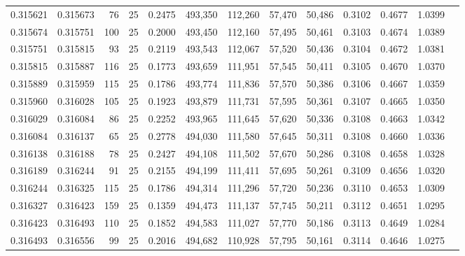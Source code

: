 \begin{tabular}{rrrrrrrrrrrrr}
0.315621 & 0.315673 &    76 &  25 &                                     0.2475 & 493,350 & 112,260 &  57,470 &  50,486 & 0.3102 & 0.4677 & 1.0399 \\
0.315674 & 0.315751 &   100 &  25 &                                     0.2000 & 493,450 & 112,160 &  57,495 &  50,461 & 0.3103 & 0.4674 & 1.0389 \\
0.315751 & 0.315815 &    93 &  25 &                                     0.2119 & 493,543 & 112,067 &  57,520 &  50,436 & 0.3104 & 0.4672 & 1.0381 \\
0.315815 & 0.315887 &   116 &  25 &                                     0.1773 & 493,659 & 111,951 &  57,545 &  50,411 & 0.3105 & 0.4670 & 1.0370 \\
0.315889 & 0.315959 &   115 &  25 &                                     0.1786 & 493,774 & 111,836 &  57,570 &  50,386 & 0.3106 & 0.4667 & 1.0359 \\
0.315960 & 0.316028 &   105 &  25 &                                     0.1923 & 493,879 & 111,731 &  57,595 &  50,361 & 0.3107 & 0.4665 & 1.0350 \\
0.316029 & 0.316084 &    86 &  25 &                                     0.2252 & 493,965 & 111,645 &  57,620 &  50,336 & 0.3108 & 0.4663 & 1.0342 \\
0.316084 & 0.316137 &    65 &  25 &                                     0.2778 & 494,030 & 111,580 &  57,645 &  50,311 & 0.3108 & 0.4660 & 1.0336 \\
0.316138 & 0.316188 &    78 &  25 &                                     0.2427 & 494,108 & 111,502 &  57,670 &  50,286 & 0.3108 & 0.4658 & 1.0328 \\
0.316189 & 0.316244 &    91 &  25 &                                     0.2155 & 494,199 & 111,411 &  57,695 &  50,261 & 0.3109 & 0.4656 & 1.0320 \\
0.316244 & 0.316325 &   115 &  25 &                                     0.1786 & 494,314 & 111,296 &  57,720 &  50,236 & 0.3110 & 0.4653 & 1.0309 \\
0.316327 & 0.316423 &   159 &  25 &                                     0.1359 & 494,473 & 111,137 &  57,745 &  50,211 & 0.3112 & 0.4651 & 1.0295 \\
0.316423 & 0.316493 &   110 &  25 &                                     0.1852 & 494,583 & 111,027 &  57,770 &  50,186 & 0.3113 & 0.4649 & 1.0284 \\
0.316493 & 0.316556 &    99 &  25 &                                     0.2016 & 494,682 & 110,928 &  57,795 &  50,161 & 0.3114 & 0.4646 & 1.0275 \\

\end{tabular}
